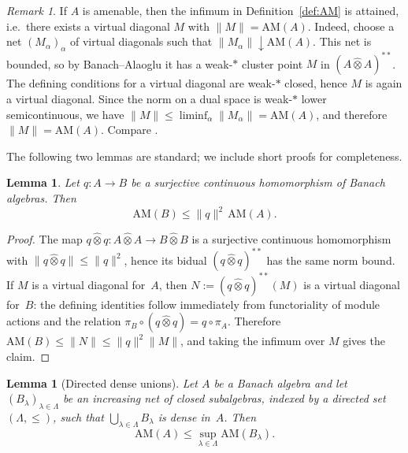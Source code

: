 \documentclass[reqno]{amsart}
\theoremstyle{plain}
\newtheorem{lemma}[theorem]{Lemma}
\theoremstyle{definition}
\theoremstyle{remark}
\newtheorem{remark}[theorem]{Remark}
\newcommand{\AM}{\mathrm{AM}}
\newcommand{\hatot}{\widehat{\otimes}}
\renewcommand{\le}{\leqslant}
\begin{document}
\begin{remark}\label{rem:AM-attained}
If $A$ is amenable, then the infimum in Definition~\ref{def:AM} is attained, i.e.\
there exists a virtual diagonal $M$ with $\|M\|=\AM(A)$.
Indeed, choose a net $(M_\alpha)_\alpha$ of virtual diagonals such that
$\|M_\alpha\|\downarrow \AM(A)$. This net is bounded, so by Banach--Alaoglu
it has a weak-$*$ cluster point $M$ in $(A\hat\otimes A)^{**}$.
The defining conditions for a virtual diagonal are weak-$*$ closed, hence $M$
is again a virtual diagonal. Since the norm on a dual space is weak-$*$ lower
semicontinuous, we have $\|M\|\le \liminf_\alpha \|M_\alpha\|=\AM(A)$, and therefore
$\|M\|=\AM(A)$. Compare \cite[Definition~2.2.7]{Runde2020ABA}.
\end{remark}


The following two lemmas are standard; we include short proofs for completeness.

\begin{lemma}\label{lem:quotient}
Let $q\colon A\to B$ be a surjective continuous homomorphism of Banach algebras. Then
\[
\AM(B)\le \|q\|^2\,\AM(A).
\]
\end{lemma}

\begin{proof}
The map $q\hatot q\colon A\hatot A\to B\hatot B$ is a surjective continuous homomorphism with
$\|q\hatot q\|\le \|q\|^2$, hence its bidual $(q\hatot q)^{**}$ has the same norm bound.
If $M$ is a virtual diagonal for~$A$, then $N:=(q\hatot q)^{**}(M)$ is a virtual diagonal for~$B$:
the defining identities follow immediately from functoriality of module actions and the relation
$\pi_B\circ (q\hatot q)=q\circ \pi_A$.
Therefore $\AM(B)\le \|N\|\le \|q\|^2\|M\|$, and taking the infimum over $M$ gives the claim.
\end{proof}

\begin{lemma}[Directed dense unions]\label{lem:dense-union}
Let $A$ be a Banach algebra and let $(B_\lambda)_{\lambda\in\Lambda}$ be an increasing net of closed subalgebras,
indexed by a directed set $(\Lambda,\le)$, such that $\bigcup_{\lambda\in\Lambda}B_\lambda$ is dense in~$A$.
Then
\[
\AM(A)\le \sup_{\lambda\in\Lambda}\AM(B_\lambda).
\]
\end{lemma}
\end{document}
